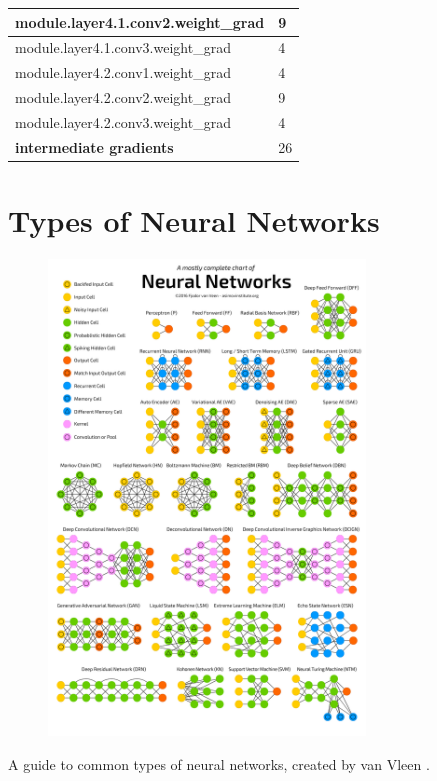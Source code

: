 \documentclass[12pt,letterpaper]{article}
\begin{document}
\begin{appendices}
\begin{longtable}{@{}ll@{}}
module.layer4.1.conv2.weight\_grad        & 9    \\ \midrule
module.layer4.1.conv3.weight\_grad        & 4    \\ \midrule
module.layer4.2.conv1.weight\_grad        & 4    \\ \midrule
module.layer4.2.conv2.weight\_grad        & 9    \\ \midrule
module.layer4.2.conv3.weight\_grad        & 4    \\ \midrule
\textbf{intermediate gradients}                       & 26   \\ \bottomrule
\end{longtable}
\newpage


\section{Types of Neural Networks}
\label{appendix:types_of_networks}
\begin{figure}[ht]
\centering
\includegraphics[width=0.75\textwidth]{types_of_NN.png}
\end{figure}
\begin{center}A guide to common types of neural networks, created by van Vleen \cite{types_of_NN_pic}.\end{center}
\newpage


\end{appendices}
\end{document}
